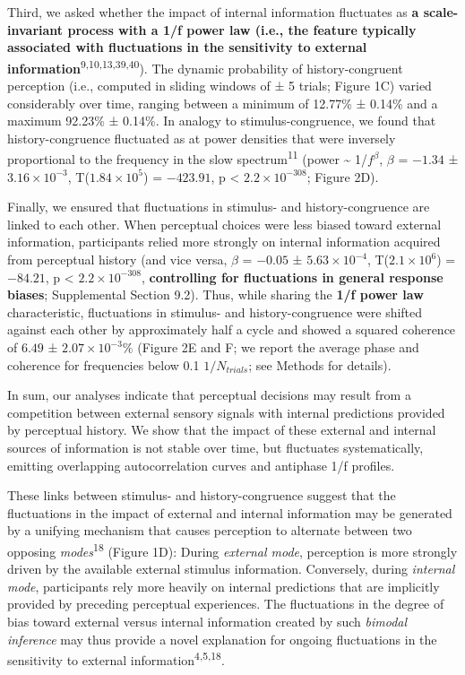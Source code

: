 \documentclass[
]{article}
\begin{document}
Third, we asked whether the impact of internal information fluctuates as
\textbf{a scale-invariant process with a 1/f power law (i.e., the
feature typically associated with fluctuations in the sensitivity to
external information}\textsuperscript{9,10,13,39,40}). The dynamic
probability of history-congruent perception (i.e., computed in sliding
windows of ± 5 trials; Figure 1C) varied considerably over time, ranging
between a minimum of 12.77\% ± 0.14\% and a maximum 92.23\% ± 0.14\%. In
analogy to stimulus-congruence, we found that history-congruence
fluctuated as at power densities that were inversely proportional to the
frequency in the slow spectrum\textsuperscript{11} (power
\textasciitilde{} 1/\(f^\beta\), \(\beta\) = \(-1.34\) ±
\(\ensuremath{3.16\times 10^{-3}}\),
T(\(\ensuremath{1.84\times 10^{5}}\)) = \(-423.91\), p < \(\ensuremath{2.2\times 10^{-308}}\); Figure
2D).

Finally, we ensured that fluctuations in stimulus- and
history-congruence are linked to each other. When perceptual choices
were less biased toward external information, participants relied more
strongly on internal information acquired from perceptual history (and
vice versa, \(\beta\) = \(-0.05\) ± \(\ensuremath{5.63\times 10^{-4}}\),
T(\(\ensuremath{2.1\times 10^{6}}\)) = \(-84.21\), p < \(\ensuremath{2.2\times 10^{-308}}\),
\textbf{controlling for fluctuations in general response biases};
Supplemental Section 9.2). Thus, while sharing the \textbf{1/f power
law} characteristic, fluctuations in stimulus- and history-congruence
were shifted against each other by approximately half a cycle and showed
a squared coherence of \(6.49\) ± \(\ensuremath{2.07\times 10^{-3}}\)\%
(Figure 2E and F; we report the average phase and coherence for
frequencies below 0.1 \(1/N_{trials}\); see Methods for details).

In sum, our analyses indicate that perceptual decisions may result from
a competition between external sensory signals with internal predictions
provided by perceptual history. We show that the impact of these
external and internal sources of information is not stable over time,
but fluctuates systematically, emitting overlapping autocorrelation
curves and antiphase 1/f profiles.

These links between stimulus- and history-congruence suggest that the
fluctuations in the impact of external and internal information may be
generated by a unifying mechanism that causes perception to alternate
between two opposing \emph{modes}\textsuperscript{18} (Figure 1D):
During \emph{external mode}, perception is more strongly driven by the
available external stimulus information. Conversely, during
\emph{internal mode}, participants rely more heavily on internal
predictions that are implicitly provided by preceding perceptual
experiences. The fluctuations in the degree of bias toward external
versus internal information created by such \emph{bimodal inference} may
thus provide a novel explanation for ongoing fluctuations in the
sensitivity to external information\textsuperscript{4,5,18}.
\end{document}
